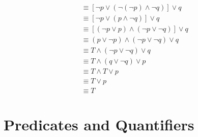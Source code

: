 \documentclass[12pt letter]{report}
\begin{document}
{\begin{enumerate}
\begin{align*}
			                                               & \equiv [\neg p \vee \left( \neg \left( \neg p \right)
				      \wedge \neg q \right) ] \vee q \tag*{By the Second De
			      Morgan's Law}                                                                                                                            \\
			                                               & \equiv [\neg p \vee \left( p \wedge \neg q \right) ] \vee q \tag*{By the Double Negation Law} \\
			                                               & \equiv [ \left( \neg p \vee p \right) \wedge \left( \neg p
			      \vee \neg q \right)  ] \vee  q \tag*{By the First Distributive Law}                                                                      \\
			                                               & \equiv \left( p \vee \neg p \right) \wedge \left( \neg p
			      \vee \neg q \right) \vee q \tag*{By the First Commutative
			      Law}                                                                                                                                     \\
			                                               & \equiv T \wedge \left( \neg p \vee \neg q \right) \vee q
			      \tag*{By the First Negation Law}                                                                                                         \\
			                                               & \equiv T \wedge (q \vee \neg q) \vee p \tag*{By the First
			      Associative Law and the First Commutative Law}                                                                                           \\
			                                               & \equiv T \wedge  T \vee  p \tag*{By the First Negation Law}                                   \\
			                                               & \equiv T \vee p \tag*{By the First Identity Law}                                              \\
			                                               & \equiv T \tag*{By the First Domination Law}
		      \end{align*}
	\end{enumerate}
}

\chapter{Predicates and Quantifiers}
\end{document}
